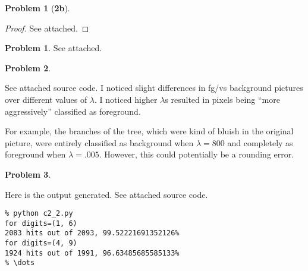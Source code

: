 \documentclass[10pt]{article}
\theoremstyle{plain}
\theoremstyle{definition}
\newtheorem{prob}{Problem}
\newtheorem*{prob*}{Problem}
\providecommand{\R}{\mathbb{R}}%
\renewcommand{\tilde}[1]{\widetilde{#1}}%
\numberwithin{equation}{section}
\begin{document}
\begin{prob*}[\bf{2b}]
\end{prob*}

\begin{proof} See attached.
%
\end{proof}
\clearpage

\begin{prob}
See attached.
\end{prob}

\begin{prob}
\end{prob}

See attached source code.
I noticed slight differences in fg/vs background pictures over different values
of $\lambda$. I noticed higher $\lambda$s resulted in pixels being ``more
aggressively'' classified as foreground.  

For example, the branches of the tree, which were kind of bluish in the
original picture, were entirely classified as background when $\lambda=800$ and
completely as foreground when $\lambda=.005$. However, this could potentially
be a rounding error. 


\begin{prob}
\end{prob}

Here is the output generated. See attached source code.
\begin{verbatim}
% python c2_2.py
for digits=(1, 6)
2083 hits out of 2093, 99.52221691352126%
for digits=(4, 9)
1924 hits out of 1991, 96.63485685585133%
% \dots
\end{verbatim}
\end{document}
